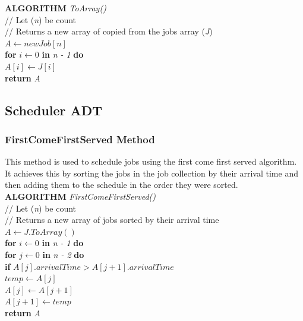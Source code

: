 \documentclass[12pt,a4paper]{article}
\begin{document}
				\textbf{ALGORITHM} \textit{ToArray()}\\
				\null\hspace{1cm}// Let (\textit{n}) be count\\
				\null\hspace{1cm}// Returns a new array of copied from the jobs array (\textit{J})\\
				\null\hspace{1cm}\textit{$A \gets new Job[n]$}\\
				\null\hspace{1cm}\textbf{for} \textit{$i \gets 0$} \textbf{in} \textit{n - 1} \textbf{do}\\
				\null\hspace{2cm}\textit{$A[i] \gets J[i]$}\\
				\null\hspace{1cm}\textbf{return} \textit{A}\\
				
		\subsection{Scheduler ADT}
			\subsubsection{FirstComeFirstServed Method}
				This method is used to schedule jobs using the first come first served algorithm. It achieves 
				this by sorting the jobs in the job collection by their arrival time and then adding them to 
				the schedule in the order they were sorted.\\

				\textbf{ALGORITHM} \textit{FirstComeFirstServed()}\\
				\null\hspace{1cm}// Let (\textit{n}) be count\\
				\null\hspace{1cm}// Returns a new array of jobs sorted by their arrival time\\
				\null\hspace{1cm}\textit{$A \gets J.ToArray()$}\\
				\null\hspace{1cm}\textbf{for} \textit{$i \gets 0$} \textbf{in} \textit{n - 1} \textbf{do}\\
				\null\hspace{2cm}\textbf{for} \textit{$j \gets 0$} \textbf{in} \textit{n - 2} \textbf{do}\\
				\null\hspace{3cm}\textbf{if} \textit{$A[j].arrivalTime > A[j + 1].arrivalTime$}\\
				\null\hspace{4cm}\textit{$temp \gets A[j]$}\\
				\null\hspace{4cm}\textit{$A[j] \gets A[j + 1]$}\\
				\null\hspace{4cm}\textit{$A[j + 1] \gets temp$}\\
				\null\hspace{1cm}\textbf{return} \textit{A}\\
	
\end{document}
